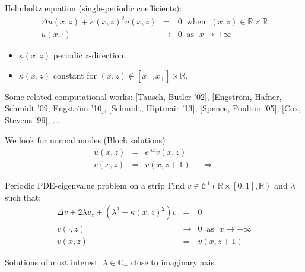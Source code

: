 \documentclass{beamer}
\newcommand{\RR}{\mathbb{R}}
\newcommand{\CC}{\mathbb{C}}
\newcommand{\mycite}[1]{$[$#1$]$}
\begin{document}
\begin{frame}
\begin{block}{Helmholtz equation (single-periodic coefficients):}\vspace{-0.8cm}
\begin{eqnarray*}
  \Delta u(x,z)+\kappa(x,z)^2u(x,z)&=&0\;\; \textrm{when }\; (x,z)\in\RR\times\RR\\
  u(x,\cdot)&\rightarrow& 0\;\;\textrm{as }\; x\rightarrow\pm\infty
\end{eqnarray*}\vspace{-0.6cm}
\begin{itemize}
  \item $\kappa(x,z)$ periodic $z$-direction. 
  \item $\kappa(x,z)$ constant for $(x,z)\not\in[x_-,x_+]\times\RR$. 
\end{itemize}\vspace{-0.2cm}
\end{block}

\begin{center}
\scalebox{0.8}{}%
\end{center}


\underline{Some related computational works}:
\mycite{Tausch, Butler '02}, \mycite{Engstr\"om, Hafner, Schmidt '09, Engstr\"om '10}, \mycite{Schmidt, Hiptmair '13}, \mycite{Spence, Poulton '05},  \mycite{Cox, Stevens '99}, $\ldots$ 


\end{frame}


\begin{frame}
We look for normal modes (Bloch solutions)
\begin{eqnarray*}
  u(x,z)&=&e^{\lambda z}v(x,z) \\
  v(x,z)&=&v(x,z+1)\;\;\;\;\;\Rightarrow
\end{eqnarray*}
\vspace{-0.8cm}
\begin{block}{Periodic PDE-eigenvalue problem on a strip}
Find $v\in\mathcal{C}^1(\RR\times[0,1],\RR)$ and $\lambda$ such that:
\begin{eqnarray*}
\Delta v+2\lambda v_z+(\lambda^2+\kappa(x,z)^2)v&=&0\\
  v(\cdot,z)&\rightarrow& 0\;\;\textrm{as }\; x\rightarrow\pm\infty\\
  v(x,z)&=&v(x,z+1)
\end{eqnarray*}
\end{block}
\begin{center}
%
\end{center}
Solutions of most interest: $\lambda\in\CC_-$ close to imaginary axis.
\end{frame}
\end{document}
